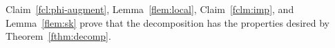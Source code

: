 \noindent
Claim~\ref{fcl:phi-augment}, Lemma~\ref{flem:local}, Claim~\ref{fclm:imp}, and Lemma~\ref{flem:sk} prove that the decomposition has the properties desired by
Theorem~\ref{fthm:decomp}.

%
%
%
%

